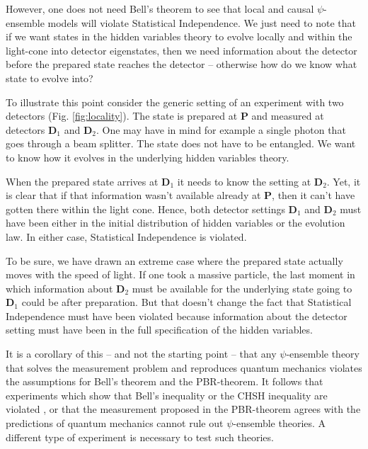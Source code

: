 \documentclass[superscriptaddress,floatfix,nofootinbib,12pt]{revtex4-2}
\begin{document}
However, one does not need Bell's theorem to see that local and causal $\psi$-ensemble models will violate Statistical Independence. We just need to note that if we want states in the hidden variables theory to evolve locally and within the light-cone into detector eigenstates, then we need information about the detector before the prepared state reaches the detector -- otherwise how do we know what state to evolve into? 

To illustrate this point consider the generic setting of an experiment with two detectors (Fig. \ref{fig:locality}). The state is prepared at {\bf P} and measured at detectors {\bf D}$_1$ and {\bf D}$_2$. One may have in mind for example a single photon that goes through a beam splitter. The state does not have to be entangled. We want to know how it evolves in the underlying hidden variables theory. 

When the prepared state arrives at {\bf D}$_1$ it needs to know the setting at {\bf D}$_2$. Yet, it is clear that if that information wasn't available already at {\bf P}, then it can't have gotten there within the light cone. Hence, both detector settings {\bf D}$_1$ and {\bf D}$_2$ must have been either in the initial distribution of hidden variables or the evolution law. In either case, Statistical Independence is violated. 

To be sure, we have drawn an extreme case where the prepared state actually moves with the speed of light. If one took a massive particle, the last moment in which information about {\bf D}$_2$ must be available for the underlying state going to {\bf D}$_1$ could be after preparation. But that doesn't change the fact that Statistical Independence must have been violated because information about the detector setting must have been in the full specification of the hidden variables. 

It is a corollary of this -- and not the starting point -- that any $\psi$-ensemble theory that solves the measurement problem and reproduces quantum mechanics violates the assumptions for Bell's theorem and the {\sc PBR}-theorem. It follows that experiments which show that Bell's inequality or the {\sc CHSH} inequality are violated \cite{Aspect1981BellViol}, or that the measurement proposed in the {\sc PBR}-theorem agrees with the predictions of quantum mechanics \cite{Ringbauer2015MeasRealWavefn} cannot rule out $\psi$-ensemble theories. A different type of experiment is necessary to test such theories.  
\end{document}
